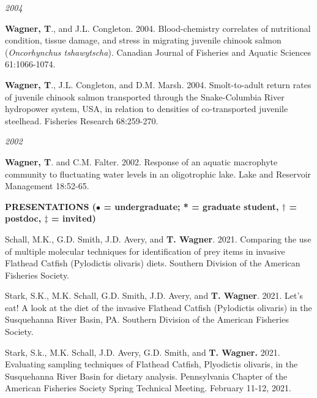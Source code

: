 \documentclass[10pt]{article}
\begin{document}
\begin{flushleft}
\begin{etaremune}[start=4]
\end{etaremune}
\emph{2004}
\begin{etaremune}[start=3]
\item {\bf Wagner, T}., and J.L. Congleton. 2004. Blood-chemistry correlates of nutritional condition, tissue damage, and stress in migrating juvenile chinook salmon (\emph{Oncorhynchus tshawytscha}). Canadian Journal of Fisheries and Aquatic Sciences 61:1066-1074.

\item {\bf Wagner, T}., J.L. Congleton, and D.M. Marsh. 2004. Smolt-to-adult return rates of juvenile chinook salmon transported through the Snake-Columbia River hydropower system, USA, in relation to densities of co-transported juvenile steelhead. Fisheries Research 68:259-270.

\end{etaremune}
\emph{2002}
\begin{etaremune}[start=1]
\item {\bf Wagner, T}. and C.M. Falter. 2002. Response of an aquatic macrophyte community to fluctuating water levels in an oligotrophic lake. Lake and Reservoir Management 18:52-65.
\end{etaremune}

\vspace{8pt}
\centerline {\bf{PRESENTATIONS ({\small $\bullet$ = undergraduate; * = graduate student, $\dagger$ = postdoc, $\ddagger$ = invited})}}
\vspace{5pt}
\begin{etaremune}

\item Schall, M.K., G.D. Smith, J.D. Avery, and \textbf{T. Wagner}. 2021. Comparing the use of multiple molecular techniques for identification of prey items in invasive Flathead Catfish (Pylodictis olivaris) diets. Southern Division of the American Fisheries Society.

\item Stark, S.K., M.K. Schall, G.D. Smith, J.D. Avery, and \textbf{T. Wagner}. 2021. Let’s eat! A look at the diet of the invasive Flathead Catfish (Pylodictis olivaris) in the Susquehanna River Basin, PA. Southern Division of the American Fisheries Society.

\item Stark, S.k., M.K. Schall, J.D. Avery, G.D. Smith, and \textbf{T. Wagner.} 2021. Evaluating sampling techniques of Flathead Catfish, Plyodictis olivaris, in the Susquehanna River Basin for dietary analysis. Pennsylvania Chapter of the American Fisheries Society Spring Technical Meeting. February 11-12, 2021.


\end{etaremune}
\end{flushleft}
\end{document}
